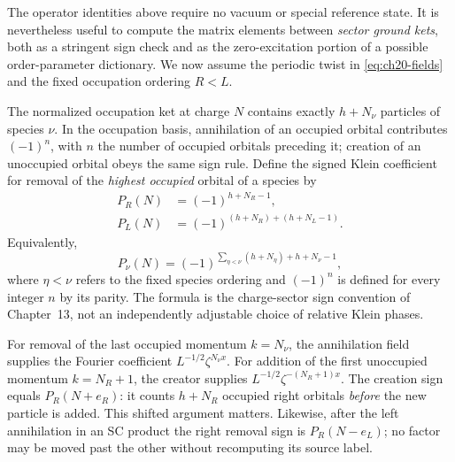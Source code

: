 The operator identities above require no vacuum or special reference
state.  It is nevertheless useful to compute the matrix elements between
\emph{sector ground kets}, both as a stringent sign check and as the
zero-excitation portion of a possible order-parameter dictionary.  We now
assume the periodic twist in \eqref{eq:ch20-fields} and the fixed
occupation ordering \(R<L\).

The normalized occupation ket at charge \(N\) contains exactly
\(h+N_\nu\) particles of species \(\nu\).  In the occupation basis,
annihilation of an occupied orbital contributes \((-1)^n\), with \(n\)
the number of occupied orbitals preceding it; creation of an unoccupied
orbital obeys the same sign rule.  Define the signed Klein coefficient for
removal of the \emph{highest occupied} orbital of a species by
\begin{equation}
 \begin{aligned}
 P_R(N)&=(-1)^{h+N_R-1},\\
 P_L(N)&=(-1)^{(h+N_R)+(h+N_L-1)}.
 \end{aligned}
 \label{eq:ch20-klein-phases}
\end{equation}
Equivalently,
\begin{equation}
 P_\nu(N)=(-1)^{\displaystyle
     \sum_{\eta<\nu}(h+N_\eta)+h+N_\nu-1},
 \label{eq:ch20-klein-general}
\end{equation}
where \(\eta<\nu\) refers to the fixed species ordering and
\((-1)^n\) is defined for every integer \(n\) by its parity.
The formula is the charge-sector sign convention of Chapter~13,
not an independently adjustable choice of relative Klein phases.

For removal of the last occupied momentum \(k=N_\nu\), the annihilation
field supplies the Fourier coefficient \(L^{-1/2}\zeta^{N_\nu x}\).
For addition of the first unoccupied momentum \(k=N_R+1\), the creator
supplies \(L^{-1/2}\zeta^{-(N_R+1)x}\).  The creation sign equals
\(P_R(N+e_R)\): it counts \(h+N_R\) occupied right orbitals
\emph{before} the new particle is added.  This shifted argument matters.
Likewise, after the left annihilation in an SC product the right removal
sign is \(P_R(N-e_L)\); no factor may be moved past the other without
recomputing its source label.

